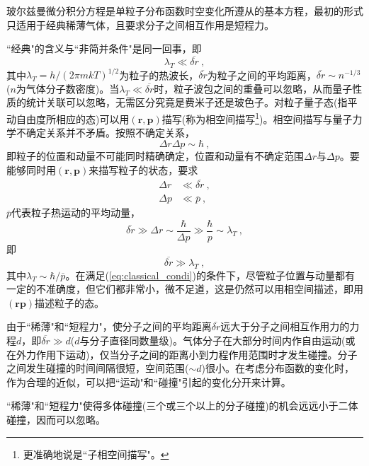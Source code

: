 \documentclass[12pt,a4paper]{article}
\renewcommand{\vec}[1]{\boldsymbol{#1}}
\begin{document}
\cite{2007热力学与统计物理学} 玻尔兹曼微分积分方程是单粒子分布函数时空变化所遵从的基本方程，最初的形式只适用于经典稀薄气体，且要求分子之间相互作用是短程力。

``经典"的含义与``非简并条件"是同一回事，即
\begin{equation}
\lambda_T \ll \overline{\delta r} ~,
\label{eq:classical_condi}
\end{equation}
其中$\lambda_T = h/(2\pi m k T)^{1/2}$为粒子的热波长，$\overline{\delta r}$为粒子之间的平均距离，$\overline{\delta r} \sim n^{-1/3}$($n$为气体分子数密度)。当$\lambda_T \ll \overline{\delta r}$时，粒子波包之间的重叠可以忽略，从而量子性质的统计关联可以忽略，无需区分究竟是费米子还是玻色子。对粒子量子态(指平动自由度所相应的态)可以用$(\vec{r}, \vec{p})$描写(称为相空间描写\footnote{更准确地说是``子相空间描写"。})。相空间描写与量子力学不确定关系并不矛盾。按照不确定关系，
\begin{equation*}
\Delta r \Delta p \sim \hbar ~,
\end{equation*}
即粒子的位置和动量不可能同时精确确定，位置和动量有不确定范围$\Delta r$与$\Delta p$。要能够同时用$(\vec{r}, \vec{p})$来描写粒子的状态，要求
\begin{align}
\Delta r &\ll \overline{\delta r} ~, \\
\Delta p &\ll \overline{p} ~,
\end{align}
$\overline{p}$代表粒子热运动的平均动量，
\begin{equation}
\overline{\delta r} \gg \Delta r \sim \dfrac{\hbar}{\Delta p} \gg \dfrac{\hbar}{ p} \sim \lambda_T ~,
\end{equation}
即
\begin{equation}
\overline{\delta r} \gg \lambda_T ~,
\end{equation}
其中$\lambda_T \sim \hbar/\overline{p}$。在满足(\ref{eq:classical_condi})的条件下，尽管粒子位置与动量都有一定的不准确度，但它们都非常小，微不足道，这是仍然可以用相空间描述，即用$(\vec{r} \vec{p})$描述粒子的态。



由于``稀薄"和``短程力"，使分子之间的平均距离$\overline{\delta r}$远大于分子之间相互作用力的力程$d$，即$\overline{\delta r} \gg d$($d$与分子直径同数量级)。气体分子在大部分时间内作自由运动(或在外力作用下运动)，仅当分子之间的距离小到力程作用范围时才发生碰撞。分子之间发生碰撞的时间间隔很短，空间范围($\sim d$)很小。在考虑分布函数的变化时，作为合理的近似，可以把``运动"和``碰撞"引起的变化分开来计算。




``稀薄"和``短程力"使得多体碰撞(三个或三个以上的分子碰撞)的机会远远小于二体碰撞，因而可以忽略。
\end{document}
